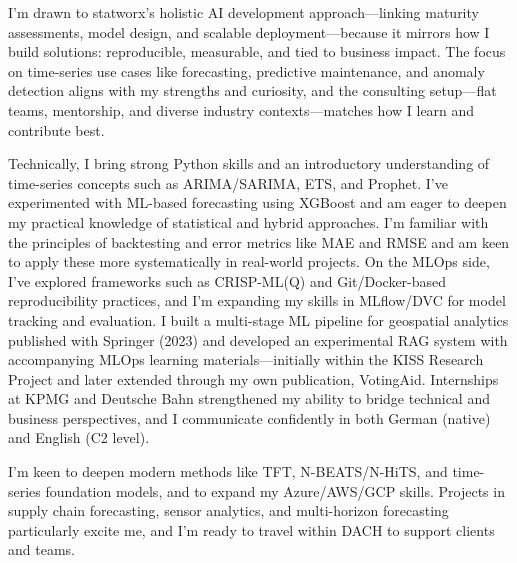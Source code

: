 I’m drawn to statworx’s holistic AI development approach—linking maturity assessments, model design, and scalable deployment—because it mirrors how I build solutions: reproducible, measurable, and tied to business impact. The focus on time-series use cases like forecasting, predictive maintenance, and anomaly detection aligns with my strengths and curiosity, and the consulting setup—flat teams, mentorship, and diverse industry contexts—matches how I learn and contribute best.

Technically, I bring strong Python skills and an introductory understanding of time-series concepts such as ARIMA/SARIMA, ETS, and Prophet. I’ve experimented with ML-based forecasting using XGBoost and am eager to deepen my practical knowledge of statistical and hybrid approaches. I’m familiar with the principles of backtesting and error metrics like MAE and RMSE and am keen to apply these more systematically in real-world projects. On the MLOps side, I’ve explored frameworks such as CRISP-ML(Q) and Git/Docker-based reproducibility practices, and I’m expanding my skills in MLflow/DVC for model tracking and evaluation. I built a multi-stage ML pipeline for geospatial analytics published with Springer (2023) and developed an experimental RAG system with accompanying MLOps learning materials—initially within the KISS Research Project and later extended through my own publication, VotingAid. Internships at KPMG and Deutsche Bahn strengthened my ability to bridge technical and business perspectives, and I communicate confidently in both German (native) and English (C2 level).

I’m keen to deepen modern methods like TFT, N-BEATS/N-HiTS, and time-series foundation models, and to expand my Azure/AWS/GCP skills. Projects in supply chain forecasting, sensor analytics, and multi-horizon forecasting particularly excite me, and I’m ready to travel within DACH to support clients and teams.